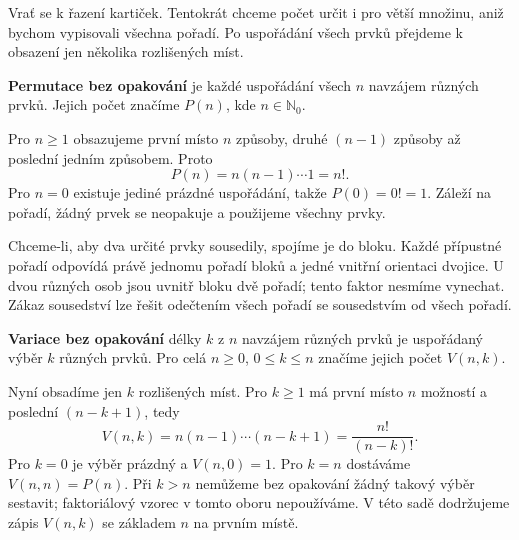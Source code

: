 \documentclass[11pt,a4paper]{article}
\begin{document}
Vrať se k řazení kartiček. Tentokrát chceme počet určit i pro větší množinu, aniž bychom vypisovali všechna pořadí. Po uspořádání všech prvků přejdeme k obsazení jen několika rozlišených míst.

\begin{definiceBox}
\textbf{Permutace bez opakování} je každé uspořádání všech $n$ navzájem různých prvků. Jejich počet značíme $P(n)$, kde $n\in\mathbb N_0$.
\end{definiceBox}

Pro $n\geq1$ obsazujeme první místo $n$ způsoby, druhé $(n-1)$ způsoby až poslední jedním způsobem. Proto
\[
 P(n)=n(n-1)\cdots1=n!.
\]
Pro $n=0$ existuje jediné prázdné uspořádání, takže $P(0)=0!=1$. Záleží na pořadí, žádný prvek se neopakuje a použijeme všechny prvky.

Chceme-li, aby dva určité prvky sousedily, spojíme je do bloku. Každé přípustné pořadí odpovídá právě jednomu pořadí bloků a jedné vnitřní orientaci dvojice. U dvou různých osob jsou uvnitř bloku dvě pořadí; tento faktor nesmíme vynechat. Zákaz sousedství lze řešit odečtením všech pořadí se sousedstvím od všech pořadí.\begin{definiceBox}
\textbf{Variace bez opakování} délky $k$ z $n$ navzájem různých prvků je uspořádaný výběr $k$ různých prvků. Pro celá $n\geq0$, $0\leq k\leq n$ značíme jejich počet $V(n,k)$.
\end{definiceBox}

Nyní obsadíme jen $k$ rozlišených míst. Pro $k\geq1$ má první místo $n$ možností a poslední $(n-k+1)$, tedy
\[
 V(n,k)=n(n-1)\cdots(n-k+1)=\frac{n!}{(n-k)!}.
\]
Pro $k=0$ je výběr prázdný a $V(n,0)=1$. Pro $k=n$ dostáváme $V(n,n)=P(n)$. Při $k>n$ nemůžeme bez opakování žádný takový výběr sestavit; faktoriálový vzorec v tomto oboru nepoužíváme. V této sadě dodržujeme zápis $V(n,k)$ se základem $n$ na prvním místě.


\end{document}
